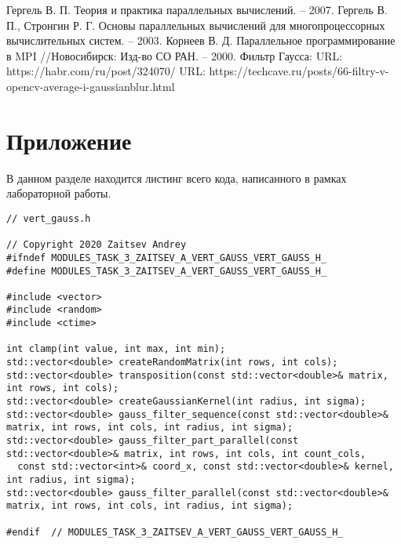 \documentclass{report}
\begin{document}
\begin{thebibliography}{1}
Гергель В. П. Теория и практика параллельных вычислений. – 2007. 
Гергель В. П., Стронгин Р. Г. Основы параллельных вычислений для многопроцессорных вычислительных систем. – 2003.
Корнеев В. Д. Параллельное программирование в MPI //Новосибирск: Изд-во СО РАН. – 2000.
Фильтр Гаусса: URL: https://habr.com/ru/post/324070/
URL: https://techcave.ru/posts/66-filtry-v-opencv-average-i-gaussianblur.html
\end{thebibliography}
\newpage

\section*{Приложение}
В данном разделе находится листинг всего кода, написанного в рамках лабораторной работы.
\begin{lstlisting}
// vert_gauss.h

// Copyright 2020 Zaitsev Andrey
#ifndef MODULES_TASK_3_ZAITSEV_A_VERT_GAUSS_VERT_GAUSS_H_
#define MODULES_TASK_3_ZAITSEV_A_VERT_GAUSS_VERT_GAUSS_H_

#include <vector>
#include <random>
#include <ctime>

int clamp(int value, int max, int min);
std::vector<double> createRandomMatrix(int rows, int cols);
std::vector<double> transposition(const std::vector<double>& matrix, int rows, int cols);
std::vector<double> createGaussianKernel(int radius, int sigma);
std::vector<double> gauss_filter_sequence(const std::vector<double>& matrix, int rows, int cols, int radius, int sigma);
std::vector<double> gauss_filter_part_parallel(const std::vector<double>& matrix, int rows, int cols, int count_cols,
  const std::vector<int>& coord_x, const std::vector<double>& kernel, int radius, int sigma);
std::vector<double> gauss_filter_parallel(const std::vector<double>& matrix, int rows, int cols, int radius, int sigma);

#endif  // MODULES_TASK_3_ZAITSEV_A_VERT_GAUSS_VERT_GAUSS_H_

\end{lstlisting}
\end{document}

